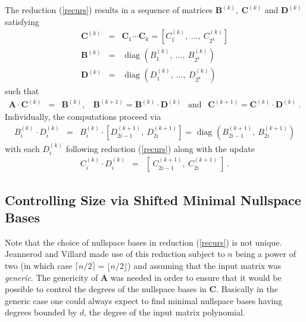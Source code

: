 \documentclass[a4paper,11pt]{article}
\begin{document}
The reduction (\ref{recurs}) results in a sequence of matrices $\mathbf{B}^{(k)}, ~\mathbf{C}^{(k)}$ and $ \mathbf{D}^{(k)}$ satisfying
\begin{eqnarray}
\mathbf{C}^{(k)} & = & \mathbf{C}_1 \cdots \mathbf{C}_k = [ C_1^{(k)} , ~\ldots , ~ C_{2^k}^{(k)} ] \nonumber \\
\mathbf{B}^{(k)} & = & \mbox{ diag } ( B_1^{(k)} , ~\ldots , ~ B_{2^k}^{(k)} ) \nonumber \\
\mathbf{D}^{(k)} & = & \mbox{ diag } ( D_1^{(k)} , ~\ldots , ~ D_{2^k}^{(k)} ) \nonumber
\end{eqnarray}
such that
\begin{eqnarray}\label{iter}
\mathbf{A} \cdot \mathbf{C}^{(k)} & = &  \mathbf{B}^{(k)}, ~~~~ \mathbf{B}^{(k+1)} = \mathbf{B}^{(k)} \cdot \mathbf{D}^{(k)} 
~~ \mbox{ and } ~~ \mathbf{C}^{(k+1)} = \mathbf{C}^{(k)} \cdot \mathbf{D}^{(k)} ~.
\end{eqnarray}
Individually, the computations proceed via
\begin{eqnarray}\label{update}
B_i^{(k)} \cdot D_i^{(k)} & = &  B_i^{(k)} \cdot [ D_{2i-1}^{(k+1)} , ~ D_{2i}^{(k+1)} ] = \mbox{ diag } ( B_{2i-1}^{(k+1)} ,~ B_{2i}^{(k+1)} ) 
\end{eqnarray}
with each $D_i^{(k)}$  following reduction (\ref{recurs}) along with the update
\begin{eqnarray}\label{update2}
 C_i^{(k)} \cdot D_i^{(k)} & = &  [ ~ C_{2i-1}^{(k+1)} , ~ C_{2i}^{(k+1)} ~ ] ~.
\end{eqnarray} 

\subsection{Controlling Size via Shifted Minimal Nullspace Bases}

Note that the choice of nullspace bases in reduction (\ref{recurs}) is not unique. Jeannerod and Villard \cite{jeannerod-villard:05} made use of this reduction subject to $n$ being a power of two (in which case $\lceil n/2 \rceil = \lfloor n/2 \rfloor$) and assuming that the input matrix was {\em generic}. The genericity of $\mathbf{A}$ was needed in order to ensure that it would be possible to control the degrees of the nullspace bases in $\mathbf{C}$. Basically in the generic case one could always expect to find minimal nullspace bases having degrees bounded by $d$, the degree of the input matrix polynomial.
\end{document}
